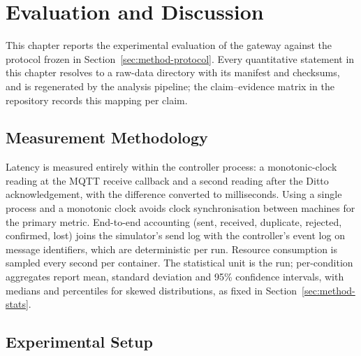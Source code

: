 
\chapter{Evaluation and Discussion}
\label{ch:evaluation}

\noindent This chapter reports the experimental evaluation of the gateway
against the protocol frozen in Section~\ref{sec:method-protocol}. Every
quantitative statement in this chapter resolves to a raw-data directory with
its manifest and checksums, and is regenerated by the analysis pipeline; the
claim--evidence matrix in the repository records this mapping per claim.

\section{Measurement Methodology}
\label{sec:eval-method}

\noindent Latency is measured entirely within the controller process: a
monotonic-clock reading at the \ac{MQTT} receive callback and a second reading
after the Ditto acknowledgement, with the difference converted to
milliseconds. Using a single process and a monotonic clock avoids clock
synchronisation between machines for the primary metric. End-to-end
accounting (sent, received, duplicate, rejected, confirmed, lost) joins the
simulator's send log with the controller's event log on message identifiers,
which are deterministic per run. Resource consumption is sampled every second
per container. The statistical unit is the run; per-condition aggregates
report mean, standard deviation and 95\% confidence intervals, with medians
and percentiles for skewed distributions, as fixed in
Section~\ref{sec:method-stats}.

\section{Experimental Setup}
\label{sec:eval-setup}

\noindent {}

